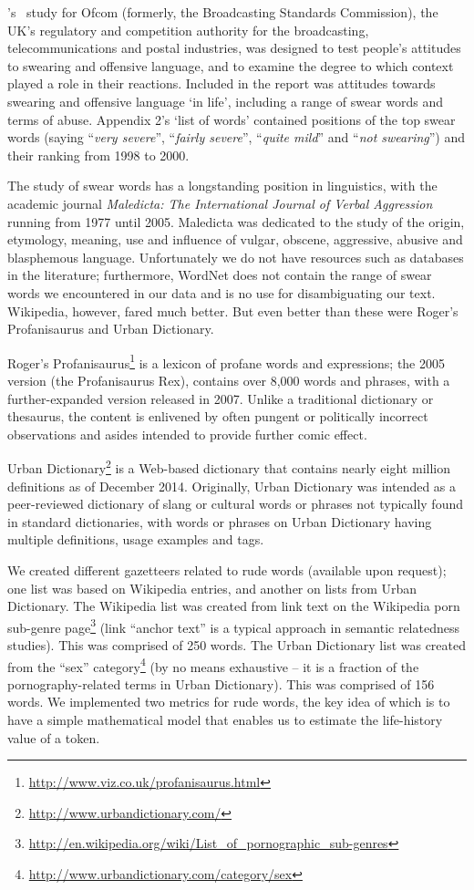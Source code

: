 \documentclass[letterpaper]{article}
\begin{document}
\citeauthor{millwood-hargrave:2000}'s~
study for Ofcom (formerly, the Broadcasting Standards Commission), the
UK's regulatory and competition authority for the broadcasting,
telecommunications and postal industries, was designed to test
people’s attitudes to swearing and offensive language, and to examine
the degree to which context played a role in their reactions. Included
in the report was attitudes towards swearing and offensive language
`in life', including a range of swear words and terms of
abuse. Appendix 2’s `list of words' contained positions of the top
swear words (saying ``{\emph{very severe}}'', ``{\emph{fairly
severe}}'', ``{\emph{quite mild}}'' and ``{\emph{not swearing}}'') and
their ranking from 1998 to 2000.

The study of swear words has a longstanding position in linguistics,
with the academic journal {\emph{Maledicta: The International Journal of
Verbal Aggression}} running from 1977 until 2005. Maledicta was
dedicated to the study of the origin, etymology, meaning, use and
influence of vulgar, obscene, aggressive, abusive and blasphemous
language. Unfortunately we do not have resources such as databases in
the literature; furthermore, WordNet does not contain the range of
swear words we encountered in our data and is no use for disambiguating
our text. Wikipedia, however, fared much better. But even better than
these were Roger's Profanisaurus and Urban Dictionary.

Roger's
Profanisaurus\footnote{\url{http://www.viz.co.uk/profanisaurus.html}}
is a lexicon of profane words and expressions; the 2005 version (the
Profanisaurus Rex), contains over 8,000 words and phrases, with a
further-expanded version released in 2007. Unlike a traditional
dictionary or thesaurus, the content is enlivened by often pungent or
politically incorrect observations and asides intended to provide
further comic effect.

Urban Dictionary\footnote{\url{http://www.urbandictionary.com/}} is a
Web-based dictionary that contains nearly eight million definitions as
of December 2014. Originally, Urban Dictionary was intended as a
peer-reviewed dictionary of slang or cultural words or phrases not
typically found in standard dictionaries, with words or phrases on
Urban Dictionary having multiple definitions, usage examples and tags.

We created different gazetteers related to rude words (available upon
request); one list was based on Wikipedia entries, and another on
lists from Urban Dictionary. The Wikipedia list was created from link
text on the Wikipedia porn sub-genre
page\footnote{\url{http://en.wikipedia.org/wiki/List_of_pornographic_sub-genres}}
(link ``anchor text'' is a typical approach in semantic relatedness
studies). This was comprised of 250 words. The Urban Dictionary list
was created from the ``sex''
category\footnote{\url{http://www.urbandictionary.com/category/sex}}
(by no means exhaustive -- it is a fraction of the pornography-related
terms in Urban Dictionary). This was comprised of 156 words. We
implemented two metrics for rude words, the key idea of which is to
have a simple mathematical model that enables us to estimate the
life-history value of a token.\\
\end{document}
